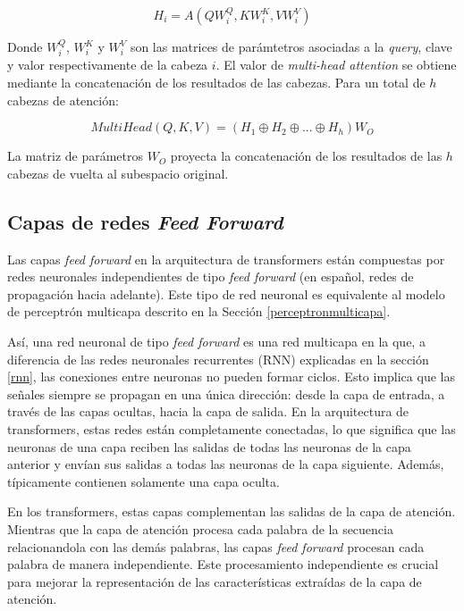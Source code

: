 \documentclass[11pt,spanish,listoffigures,listoftables]{tfgetsinf}
\begin{document}
\begin{equation}
H_i = A(QW_i^Q, KW_i^K, VW_i^V)
\end{equation}

Donde $W_i^Q$, $W_i^K$ y $W_i^V$ son las matrices de parámtetros asociadas a la \textit{query}, clave y valor respectivamente de la cabeza $i$. El valor de \textit{multi-head attention} se obtiene mediante la concatenación de los resultados de las cabezas. Para un total de $h$ cabezas de atención:

\begin{equation}
MultiHead(Q, K, V) = (H_1 \oplus H_2 \oplus ... \oplus H_h)W_O
\end{equation}

La matriz de parámetros $W_O$ proyecta la concatenación de los resultados de las $h$ cabezas de vuelta al subespacio original. \cite{cordonnier2021multiheadattentioncollaborateinstead, multiheaddotproduct, jurafsky2023speech}

\subsection{Capas de redes \textit{Feed Forward}}

Las capas \textit{feed forward} en la arquitectura de transformers están compuestas por redes neuronales independientes de tipo \textit{feed forward} (en español, redes de propagación hacia adelante). Este tipo de red neuronal es equivalente al modelo de perceptrón multicapa descrito en la Sección  \ref{perceptronmulticapa}.

Así, una red neuronal de tipo \textit{feed forward} es una red multicapa en la que, a diferencia de las redes neuronales recurrentes (RNN) explicadas en la sección \ref{rnn}, las conexiones entre neuronas no pueden formar ciclos. Esto implica que las señales siempre se propagan en una única dirección: desde la capa de entrada, a través de las capas ocultas, hacia la capa de salida. En la arquitectura de transformers, estas redes están completamente conectadas, lo que significa que las neuronas de una capa reciben las salidas de todas las neuronas de la capa anterior y envían sus salidas a todas las neuronas de la capa siguiente. Además, típicamente contienen solamente una capa oculta.

En los transformers, estas capas complementan las salidas de la capa de atención. Mientras que la capa de atención procesa cada palabra de la secuencia relacionandola con las demás palabras, las capas \textit{feed forward} procesan cada palabra de manera independiente. Este procesamiento independiente es crucial para mejorar la representación de las características extraídas de la capa de atención.
\end{document}

